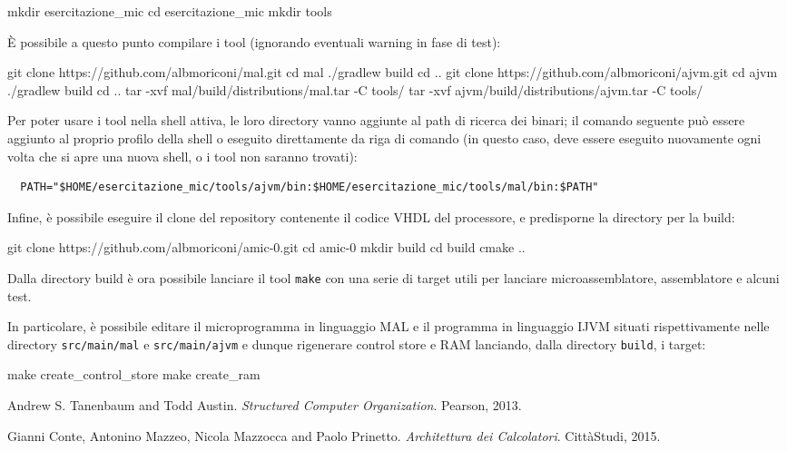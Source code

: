 \documentclass[a4paper,12pt]{scrreprt}
\begin{document}
\begin{commandshell}
  mkdir esercitazione_mic
  cd esercitazione_mic
  mkdir tools
\end{commandshell}

È possibile a questo punto compilare i tool (ignorando eventuali warning in fase
di test):

\begin{commandshell}
  git clone https://github.com/albmoriconi/mal.git
  cd mal
  ./gradlew build
  cd ..
  git clone https://github.com/albmoriconi/ajvm.git
  cd ajvm
  ./gradlew build
  cd ..
  tar -xvf mal/build/distributions/mal.tar -C tools/
  tar -xvf ajvm/build/distributions/ajvm.tar -C tools/
\end{commandshell}

Per poter usare i tool nella shell attiva, le loro directory vanno aggiunte al
path di ricerca dei binari; il comando seguente può essere aggiunto al proprio
profilo della shell o eseguito direttamente da riga di comando (in questo caso,
deve essere eseguito nuovamente ogni volta che si apre una nuova shell, o i tool
non saranno trovati):

\begin{lstlisting}
  PATH="$HOME/esercitazione_mic/tools/ajvm/bin:$HOME/esercitazione_mic/tools/mal/bin:$PATH"
\end{lstlisting}

Infine, è possibile eseguire il clone del repository contenente il codice VHDL
del processore, e predisporne la directory per la build:

\begin{commandshell}
  git clone https://github.com/albmoriconi/amic-0.git
  cd amic-0
  mkdir build
  cd build
  cmake ..
\end{commandshell}

Dalla directory build è ora possibile lanciare il tool \lstinline{make} con una
serie di target utili per lanciare microassemblatore, assemblatore e alcuni
test.

In particolare, è possibile editare il microprogramma in linguaggio MAL e il
programma in linguaggio IJVM situati rispettivamente nelle directory
\lstinline{src/main/mal} e \lstinline{src/main/ajvm} e dunque rigenerare control
store e RAM lanciando, dalla directory \lstinline{build}, i target:

\begin{commandshell}
  make create_control_store
  make create_ram
\end{commandshell}

\begin{thebibliography}{2}
  Andrew S. Tanenbaum and Todd Austin.
  \textit{Structured Computer Organization}.
  Pearson, 2013.

  Gianni Conte, Antonino Mazzeo, Nicola Mazzocca and Paolo Prinetto.
  \textit{Architettura dei Calcolatori}.
  CittàStudi, 2015.
\end{thebibliography}
\end{document}
